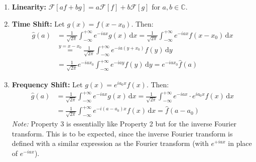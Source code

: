 \begin{proposition}[Properties]
\begin{enumerate}
    \item \textbf{Linearity:} $\mathcal{F}[af + bg] = a\mathcal{F}[f] + b\mathcal{F}[g]$ for $a, b \in \mathbb{C}$.
    
    \item \textbf{Time Shift:} Let $g(x) = f(x - x_0)$. Then:
    \begin{align*}
        \hat{g}(a) &= \frac{1}{\sqrt{2\pi}} \int_{-\infty}^{+\infty} e^{-iax} g(x) \,\mathrm{d}x 
        = \frac{1}{\sqrt{2\pi}} \int_{-\infty}^{+\infty} e^{-iax} f(x - x_0) \,\mathrm{d}x \\
        &\stackrel{y = x - x_0}{=} \frac{1}{\sqrt{2\pi}} \int_{-\infty}^{+\infty} e^{-ia(y+x_0)} f(y) \,\mathrm{d}y \\
        &= \frac{1}{\sqrt{2\pi}} e^{-iax_0} \int_{-\infty}^{+\infty} e^{-iay} f(y) \,\mathrm{d}y = e^{-iax_0} \hat{f}(a)
    \end{align*}

    \item \textbf{Frequency Shift:} Let $g(x) = e^{ia_0x} f(x)$. Then:
    \begin{align*}
        \hat{g}(a) &= \frac{1}{\sqrt{2\pi}} \int_{-\infty}^{+\infty} e^{-iax} g(x) \,\mathrm{d}x 
        = \frac{1}{\sqrt{2\pi}} \int_{-\infty}^{+\infty} e^{-iax} \cdot e^{ia_0x} f(x) \,\mathrm{d}x \\
        &= \frac{1}{\sqrt{2\pi}} \int_{-\infty}^{+\infty} e^{-i(a - a_0)x} f(x) \,\mathrm{d}x = \hat{f}(a - a_0)
    \end{align*}
    \textit{Note:} Property 3 is essentially like Property 2 but for the inverse Fourier transform. This is to be expected, since the inverse Fourier transform is defined with a similar expression as the Fourier transform (with $e^{+iax}$ in place of $e^{-iax}$).


\end{enumerate}
\end{proposition}
